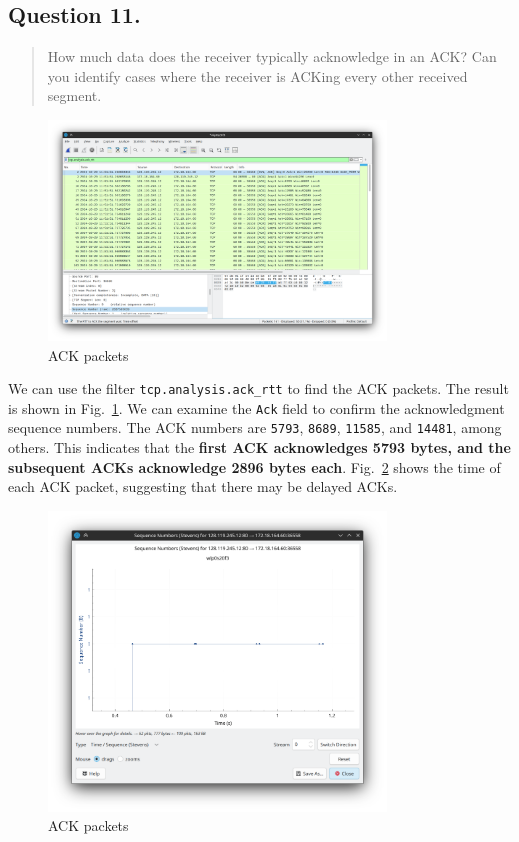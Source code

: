 \documentclass{cshwk}
\begin{document}
\subsection*{Question 11.}

\begin{quote}
    How much data does the receiver typically acknowledge in an ACK? Can you identify cases where the receiver is ACKing every other received segment.
\end{quote}

\begin{figure}[htbp]
    \centering
    \includegraphics[width=0.8\textwidth]{./lab3-9.png}
    \caption{ACK packets}
    \label{fig:ACK}
\end{figure}


We can use the filter \texttt{tcp.analysis.ack\_rtt} to find the ACK packets. The result is shown in Fig.~\ref{fig:ACK}. We can examine the \texttt{Ack} field to confirm the acknowledgment sequence numbers. The ACK numbers are \texttt{5793}, \texttt{8689}, \texttt{11585}, and \texttt{14481}, among others. This indicates that the \textbf{first ACK acknowledges 5793 bytes, and the subsequent ACKs acknowledge 2896 bytes each}. Fig.~\ref{fig:ACK2} shows the time of each ACK packet, suggesting that there may be delayed ACKs.

\begin{figure}[htbp]
    \centering
    \includegraphics[width=0.8\textwidth]{./lab3-10.png}
    \caption{ACK packets}
    \label{fig:ACK2}
\end{figure}
\end{document}
